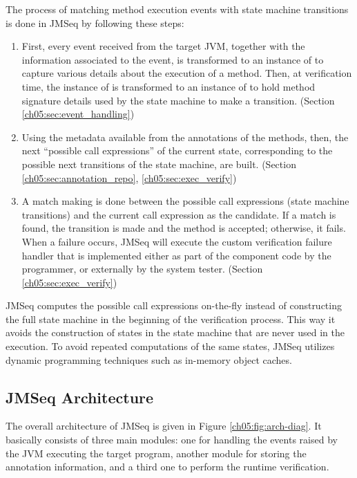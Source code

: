 The process of matching method execution events with state machine transitions is done in JMSeq by following these steps:
\begin{enumerate}
  \item %
  First, every event received from the target JVM, together with the information associated to the event, is transformed to an instance of  to capture various details about the execution of a method. 
  Then, at verification time, the instance of  is transformed to an instance of  to hold method signature details used by the state machine to make a transition. (Section \ref{ch05:sec:event_handling})
  \item Using the metadata available from the annotations of the methods, then, the   next ``possible call expressions'' of the current state, corresponding to the possible next transitions of the state machine,  are built. (Section \ref{ch05:sec:annotation_repo}, \ref{ch05:sec:exec_verify})
  \item A match making is done between the possible call expressions (state machine transitions) and the   current call expression as the candidate.  
  If a match is found,  the transition is made and the method is  accepted; otherwise, it fails. 
  When a failure occurs, JMSeq will execute the custom verification failure handler that is implemented either as part of
  the component code by the programmer, or externally by the system tester. (Section \ref{ch05:sec:exec_verify})
\end{enumerate}

JMSeq computes the possible call expressions on-the-fly instead of constructing the full state machine in the beginning of the verification process. 
This way it avoids the construction of states in the state machine that are never used in the execution. 
To avoid repeated computations of the same states, JMSeq utilizes dynamic programming techniques such as in-memory object caches. 

\subsection{JMSeq Architecture}

The overall architecture of JMSeq is given in Figure \ref{ch05:fig:arch-diag}. It basically
consists of three main modules: one for handling the events raised by the JVM executing the target program, another module for storing the annotation information, and a third
one to perform the runtime verification.

